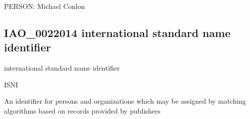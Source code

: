 \documentclass[letterpaper,10pt,english]{sphinxmanual}
\begin{document}
\begin{sphinxShadowBox}

\sphinxAtStartPar
PERSON: Michael Conlon
\end{sphinxShadowBox}
\begin{quote}

\ignorespaces \end{quote}


\subsection{IAO\_0022014 \sphinxhyphen{} international standard name identifier}
\label{\detokenize{doc-IAO_0022014:iao-0022014-international-standard-name-identifier}}\label{\detokenize{doc-IAO_0022014:index-0}}\label{\detokenize{doc-IAO_0022014::doc}}
\begin{sphinxShadowBox}

\sphinxAtStartPar
international standard name identifier
\end{sphinxShadowBox}

\begin{sphinxShadowBox}

\sphinxAtStartPar
ISNI

\sphinxAtStartPar
{}
\end{sphinxShadowBox}

\begin{sphinxShadowBox}

\sphinxAtStartPar
{\hyperref[\detokenize{doc-IAO_0000578::doc}]{}}
\end{sphinxShadowBox}

\begin{sphinxShadowBox}

\sphinxAtStartPar
An identifier for persons and organizations which may be assigned by matching algorithms based on records provided by publishers
\end{sphinxShadowBox}
\end{document}
